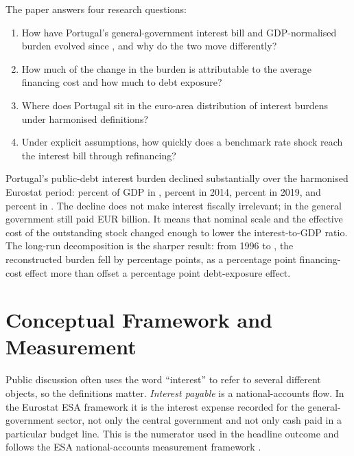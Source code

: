 \documentclass[11pt,a4paper]{article}
\begin{document}
The paper answers four research questions:
\begin{enumerate}
  \item How have Portugal's general-government interest bill and GDP-normalised
        burden evolved since \MainStartYear{}, and why do the two move
        differently?
  \item How much of the change in the burden is attributable to the average
        financing cost and how much to debt exposure?
  \item Where does Portugal sit in the euro-area distribution of interest
        burdens under harmonised definitions?
  \item Under explicit assumptions, how quickly does a benchmark rate shock
        reach the interest bill through refinancing?
\end{enumerate}

Portugal's public-debt interest burden declined substantially over the
harmonised Eurostat period: \InitialInterestPctGdp{} percent of GDP in
\MainStartYear{}, \InterestPctGdpTwentyFourteen{} percent in 2014,
\InterestPctGdpTwentyNineteen{} percent in 2019, and
\LatestInterestPctGdp{} percent in \LatestYear{}. The decline does not make
interest fiscally irrelevant; in \LatestYear{} the general government still
paid EUR \LatestInterestEurBn{} billion. It means that nominal scale and the
effective cost of the outstanding stock changed enough to lower the
interest-to-GDP ratio. The long-run decomposition is the sharper result: from
1996 to \LatestYear{}, the reconstructed burden fell by
\DecompTotalNineteenNinetySixToLatestPp{} percentage points, as a
\DecompRateNineteenNinetySixToLatestPp{} percentage point financing-cost effect
more than offset a \DecompExposureNineteenNinetySixToLatestPp{} percentage point
debt-exposure effect.

\section{Conceptual Framework and Measurement}
\label{sec:framework}

Public discussion often uses the word ``interest'' to refer to several
different objects, so the definitions matter. \emph{Interest payable} is a
national-accounts flow. In the Eurostat
ESA framework it is the interest expense recorded for the general-government
sector, not only the central government and not only cash paid in a particular
budget line. This is the numerator used in the headline outcome and follows
the ESA national-accounts measurement framework \cite{esa2010,eurostatgov}.
\end{document}
